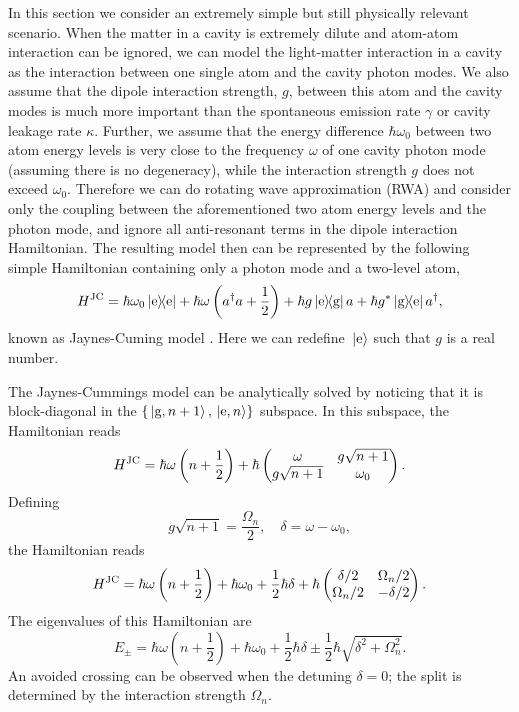 \documentclass[hyperref, a4paper]{article}
\newcommand*{\kete}{\ket*{\text{e}}}
\newcommand*{\dyade}{\dyad{\text{e}}}
\newcommand*{\dyadeg}{\dyad{\text{e}}{\text{g}}}
\newcommand*{\dyadge}{\dyad{\text{g}}{\text{e}}}
\newcommand*{\statee}{\text{e}}
\newcommand*{\stateg}{\text{g}}
\begin{document}
In this section we consider an extremely simple but still physically relevant scenario. 
When the matter in a cavity is extremely dilute and
atom-atom interaction can be ignored,
we can model the light-matter interaction in a cavity
as the interaction between one single atom and the cavity photon modes.
We also assume that the dipole interaction strength, $g$, between this atom and the cavity modes
is much more important than 
the spontaneous emission rate $\gamma$ or cavity leakage rate $\kappa$.
Further, we assume that the energy difference $\hbar \omega_0$ between two atom energy levels
is very close to the frequency $\omega$ of one cavity photon mode (assuming there is no degeneracy),
while the interaction strength $g$ does not exceed $\omega_0$.
Therefore we can do rotating wave approximation (RWA)
and consider only the coupling between the aforementioned two atom energy levels and the photon mode,
and ignore all anti-resonant terms in the dipole interaction Hamiltonian.
The resulting model then can be represented by the following simple Hamiltonian
containing only a photon mode and a two-level atom,
\begin{equation}
    H^{\text{JC}} = \hbar \omega_0 \dyade + \hbar \omega \left( a^\dag a + \frac{1}{2} \right) + \hbar g \dyadeg a + \hbar g^* \dyadge a^\dag,
\end{equation}
known as Jaynes-Cuming model \cite{bina2012coherent}.
Here we can redefine $\kete$ such that $g$ is a real number.

The Jaynes-Cummings model can be analytically solved
by noticing that it is block-diagonal in the $\{\ket*{\stateg, n+1}, \ket*{\statee, n}\}$ subspace.
In this subspace, the Hamiltonian reads
\begin{equation}
    H^{\text{JC}} = \hbar \omega \left(n + \frac{1}{2}\right) + \hbar \pmqty{
        \omega & g \sqrt{n+1} \\
        g \sqrt{n+1} & \omega_0 
    }.
\end{equation}
Defining 
\begin{equation}
    g \sqrt{n+1} = \frac{\Omega_n}{2}, \quad \delta = \omega - \omega_0,
\end{equation}
the Hamiltonian reads 
\begin{equation}
    H^{\text{JC}} = \hbar \omega \left( n + \frac{1}{2} \right) + \hbar \omega_0 + \frac{1}{2} \hbar \delta + \hbar 
    \pmqty{
        \delta / 2 & \Omega_n / 2 \\
        \Omega_n / 2 & - \delta / 2
    }.
\end{equation}
The eigenvalues of this Hamiltonian are 
\begin{equation}
    E_\pm = \hbar \omega \left( n + \frac{1}{2} \right) + \hbar \omega_0 + \frac{1}{2} \hbar \delta 
    \pm \frac{1}{2} \hbar \sqrt{\delta^2 + \Omega_n^2}.
\end{equation}
An avoided crossing can be observed when the detuning $\delta=0$;
the split is determined by the interaction strength $\Omega_n$.
\end{document}

